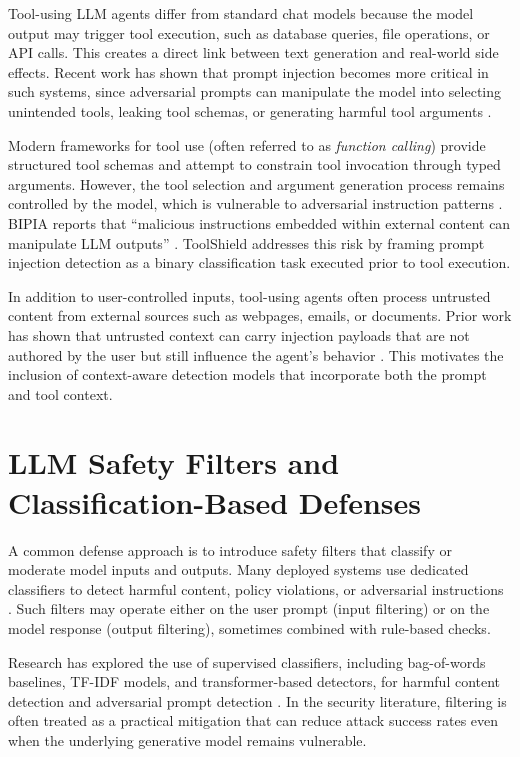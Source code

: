 Tool-using LLM agents differ from standard chat models because the model output may trigger tool execution, such as database queries, file operations, or API calls. This creates a direct link between text generation and real-world side effects. Recent work has shown that prompt injection becomes more critical in such systems, since adversarial prompts can manipulate the model into selecting unintended tools, leaking tool schemas, or generating harmful tool arguments \cite{tool_use_security}.

Modern frameworks for tool use (often referred to as \emph{function calling}) provide structured tool schemas and attempt to constrain tool invocation through typed arguments. However, the tool selection and argument generation process remains controlled by the model, which is vulnerable to adversarial instruction patterns \cite{function_calling_risks}. BIPIA reports that \enquote{malicious instructions embedded within external content can manipulate LLM outputs} \cite{function_calling_risks}. ToolShield addresses this risk by framing prompt injection detection as a binary classification task executed prior to tool execution.

In addition to user-controlled inputs, tool-using agents often process untrusted content from external sources such as webpages, emails, or documents. Prior work has shown that untrusted context can carry injection payloads that are not authored by the user but still influence the agent's behavior \cite{prompt_injection_survey}. This motivates the inclusion of context-aware detection models that incorporate both the prompt and tool context.

\section{LLM Safety Filters and Classification-Based Defenses}
\label{subsec:rw_safety_filters}

A common defense approach is to introduce safety filters that classify or moderate model inputs and outputs. Many deployed systems use dedicated classifiers to detect harmful content, policy violations, or adversarial instructions \cite{safety_classifier_overview}. Such filters may operate either on the user prompt (input filtering) or on the model response (output filtering), sometimes combined with rule-based checks.

Research has explored the use of supervised classifiers, including bag-of-words baselines, TF-IDF models, and transformer-based detectors, for harmful content detection and adversarial prompt detection \cite{harmful_prompt_detection}. In the security literature, filtering is often treated as a practical mitigation that can reduce attack success rates even when the underlying generative model remains vulnerable.

